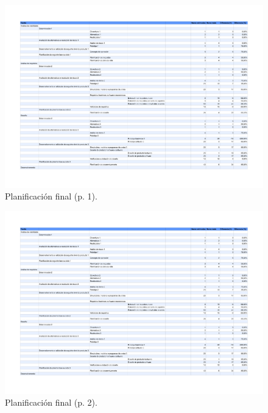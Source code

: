 \begin{figure}[htbp]
 \centering
 \includegraphics[scale=0.7,angle=90,page=1,keepaspectratio=true]{./imagenes/planificacion-final.pdf}
 \caption{Planificación final (p. 1).}
 \label{figura:PlanificacionFinal1}
\end{figure}

\begin{figure}[htbp]
 \centering
 \includegraphics[scale=0.7,angle=90,page=2,keepaspectratio=true]{./imagenes/planificacion-final.pdf}
 \caption{Planificación final (p. 2).}
 \label{figura:PlanificacionFinal2}
\end{figure}

